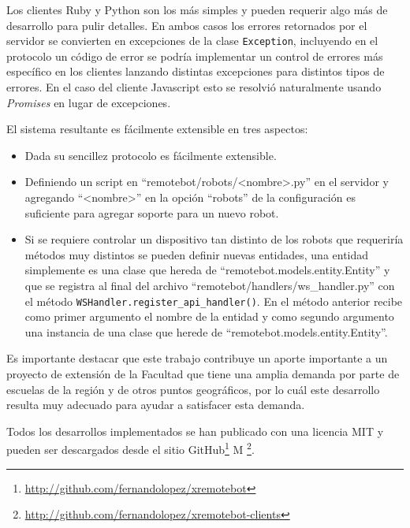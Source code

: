 Los clientes Ruby y Python son los más simples y pueden requerir algo
más de desarrollo para pulir detalles. En ambos casos los errores
retornados por el servidor se convierten en excepciones de la clase
\texttt{Exception}, incluyendo en el protocolo un código de error
se podría implementar un control de errores más específico en
los clientes lanzando distintas excepciones para distintos tipos
de errores. En el caso del cliente Javascript esto se resolvió
naturalmente usando \textit{Promises} en lugar de excepciones.

El sistema resultante es fácilmente extensible en tres aspectos:
\begin{itemize}
    \item Dada su sencillez protocolo es fácilmente extensible.
    \item Definiendo un script en ``remotebot/robots/<nombre>.py''
en el servidor y agregando ``<nombre>'' en la opción ``robots''
de la configuración es suficiente para agregar soporte
para un nuevo robot.
    \item Si se requiere controlar un dispositivo tan distinto de los
        robots que requeriría métodos muy distintos se pueden definir
        nuevas entidades, una entidad simplemente es una clase que
        hereda de ``remotebot.models.entity.Entity'' y que se
        registra al final del archivo ``remotebot/handlers/ws\_handler.py''
        con el método \texttt{WSHandler.register\_api\_handler()}.
        En el método anterior recibe como primer argumento el
        nombre de la entidad y como segundo argumento una instancia
        de una clase que herede de ``remotebot.models.entity.Entity''.
\end{itemize}

Es importante destacar que este trabajo contribuye un aporte importante a
un proyecto de extensión de la Facultad que tiene una amplia demanda
por parte de escuelas de la región y de otros puntos geográficos, por
lo cuál este desarrollo resulta muy adecuado para ayudar a satisfacer
esta demanda.

Todos los desarrollos implementados se han publicado con una licencia
MIT y pueden ser descargados desde el sitio
GitHub\footnote{\url{http://github.com/fernandolopez/xremotebot}}%
M
\footnote{\url{http://github.com/fernandolopez/xremotebot-clients}}.

